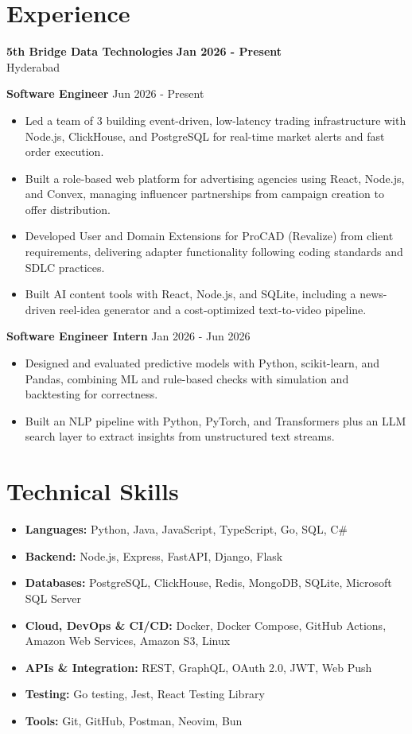 \documentclass[a4paper,11pt]{article}
\newcommand{\resumeItem}[1]{\item \small{#1}}
\newcommand{\resumeSubheading}[4]{%
  \textbf{#1} \hfill \textbf{#2} \\
{#3} \hfill {#4}
}
\newcommand{\resumeSubHeadingListStart}{\begin{itemize}}
\newcommand{\resumeSubHeadingListEnd}{\end{itemize}}
\begin{document}
\section*{Experience}

\resumeSubheading
{5th Bridge Data Technologies}{Jan 2026 - Present}
{Hyderabad}{}

\textbf{Software Engineer} \hfill {Jun 2026 - Present}
\resumeSubHeadingListStart
\resumeItem{Led a team of 3 building event-driven, low-latency trading infrastructure with Node.js, ClickHouse, and PostgreSQL for real-time market alerts and fast order execution.}
\resumeItem{Built a role-based web platform for advertising agencies using React, Node.js, and Convex, managing influencer partnerships from campaign creation to offer distribution.}
\resumeItem{Developed User and Domain Extensions for ProCAD (Revalize) from client requirements, delivering adapter functionality following coding standards and SDLC practices.}
\resumeItem{Built AI content tools with React, Node.js, and SQLite, including a news-driven reel-idea generator and a cost-optimized text-to-video pipeline.}
\resumeSubHeadingListEnd

\textbf{Software Engineer Intern} \hfill {Jan 2026 - Jun 2026}
\resumeSubHeadingListStart
\resumeItem{Designed and evaluated predictive models with Python, scikit-learn, and Pandas, combining ML and rule-based checks with simulation and backtesting for correctness.}
\resumeItem{Built an NLP pipeline with Python, PyTorch, and Transformers plus an LLM search layer to extract insights from unstructured text streams.}
\resumeSubHeadingListEnd


\section*{Technical Skills}
\begin{itemize}
\item \textbf{Languages:} Python, Java, JavaScript, TypeScript, Go, SQL, C\#
\item \textbf{Backend:} Node.js, Express, FastAPI, Django, Flask
\item \textbf{Databases:} PostgreSQL, ClickHouse, Redis, MongoDB, SQLite, Microsoft SQL Server
\item \textbf{Cloud, DevOps \& CI/CD:} Docker, Docker Compose, GitHub Actions, Amazon Web Services, Amazon S3, Linux
\item \textbf{APIs \& Integration:} REST, GraphQL, OAuth 2.0, JWT, Web Push
\item \textbf{Testing:} Go testing, Jest, React Testing Library
\item \textbf{Tools:} Git, GitHub, Postman, Neovim, Bun
\end{itemize}
\vspace{-0.2em}
\end{document}
